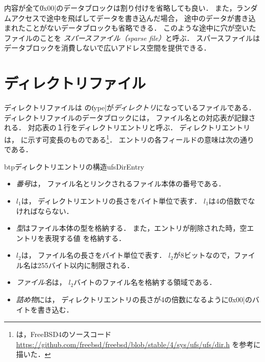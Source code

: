 内容が全て\|0x00|のデータブロックは割り付けを省略しても良い．
また，ランダムアクセスで途中を飛ばしてデータを書き込んだ場合，
途中のデータが書き込まれたことがないデータブロックも省略できる．
このような途中に穴が空いたファイルのことを
\emph{スパースファイル（sparse file）}と呼ぶ．
スパースファイルはデータブロックを消費しないで広いアドレス空間を提供できる．

\section{ディレクトリファイル}
ディレクトリファイルは
\inode の\|type|が\emph{ディレクトリ}になっているファイルである．
ディレクトリファイルのデータブロックには，
ファイル名と\inode の対応表が記録される．
対応表の１行をディレクトリエントリと呼ぶ．
ディレクトリエントリは，
に示す可変長のものである\footnote{
は，FreeBSD4のソースコード
\url{https://github.com/freebsd/freebsd/blob/stable/4/sys/ufs/ufs/dir.h}
を参考に描いた．
}．
エントリの各フィールドの意味は次の通りである．

\begin{myfig}{btp}{ディレクトリエントリの構造}{ufsDirEntry}
\end{myfig}

\begin{itemize}
\item  \emph{\inode 番号}は，
  ファイル名とリンクされるファイル本体の\inode 番号である．
\item \emph{$l_1$}は，
  ディレクトリエントリの長さをバイト単位で表す．
  $l_1$は4の倍数でなければならない．
\item \emph{型}はファイル本体の型を格納する．
  また，エントリが削除された時，空エントリを表現する値%
  を格納する．
\item \emph{$l_2$}は，
  ファイル名の長さをバイト単位で表す．
  $l_2$が8ビットなので，ファイル名は255バイト以内に制限される．
\item \emph{ファイル名}は，
  $l_2$バイトのファイル名を格納する領域である．
\item \emph{詰め物}には，
  ディレクトリエントリの長さが4の倍数になるように\|0x00|のバイトを書き込む．
\end{itemize}

